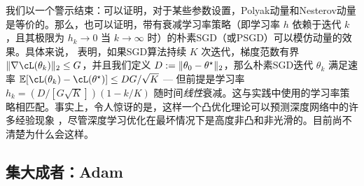 \documentclass[../../book-main.tex]{subfiles}
\begin{document}
我们以一个警示结束：可以证明，对于某些参数设置，Polyak动量和Nesterov动量是等价的。那么，也可以证明，带有衰减学习率策略（即学习率 \(h\) 依赖于迭代 \(k\)，且其极限为 \(h_{k} \to 0\) 当 \(k \to \infty\) 时）的朴素SGD（或PSGD）可以模仿动量的效果。具体来说，\cite{defazio2023optimal} 表明，如果SGD算法持续 \(K\) 次迭代，梯度范数有界 \(\norm{\nabla \cL(\theta_{k})}_{2} \leq G\)，并且我们定义 \(D := \norm{\theta_{0} - \theta^{\star}}_{2}\)，那么朴素SGD迭代 \(\theta_{k}\) 满足速率 \(\Ex[\cL(\theta_{k}) - \cL(\theta^{\star})] \leq DG/\sqrt{K}\) --- 但前提是学习率 \(h_{k} = (D/[G\sqrt{K}])(1 - k/K)\) 随时间\textit{线性}衰减。这与实践中使用的学习率策略相匹配。事实上，令人惊讶的是，这样一个凸优化理论可以预测深度网络中的许多经验现象 \cite{schaipp2025surprising}，尽管深度学习优化在最坏情况下是高度非凸和非光滑的。目前尚不清楚为什么会这样。


\subsection{集大成者：Adam}
\end{document}
